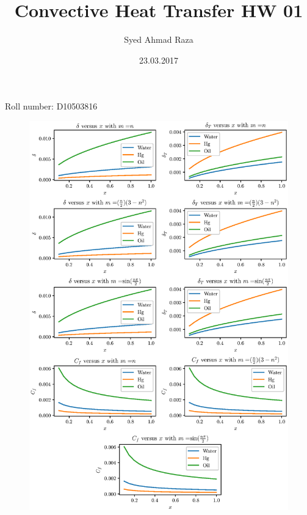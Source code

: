 \documentclass[12pt,a4paper,fleqn]{article}
\title{Convective Heat Transfer HW 01}
\date{23.03.2017}
\author{Syed Ahmad Raza}
\begin{document}
\maketitle

\centering
\large{Roll number: D10503816}

\begin{figure}[p!]
\centering
\includegraphics[width=\textwidth,height=\textheight,keepaspectratio]{all.eps}
\end{figure}
\end{document}
